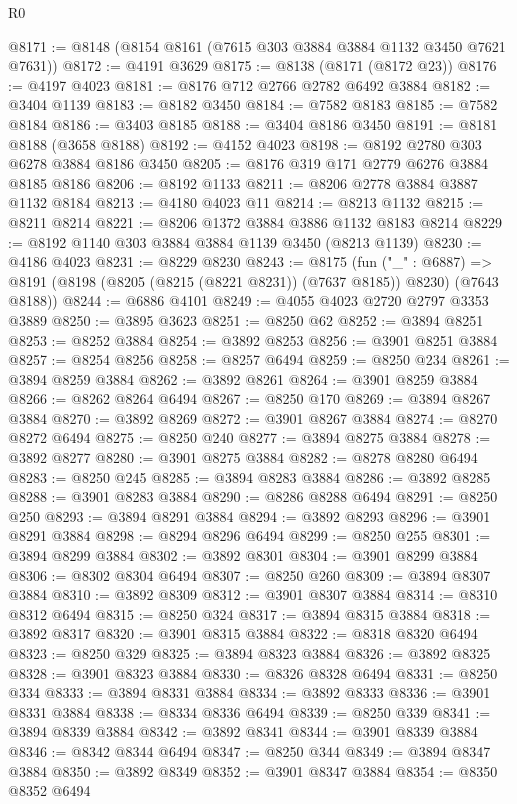 \begin{lexlean}{R0}
\begin{coremodule}
@8171 := @8148 (@8154 @8161 (@7615 @303 @3884 @3884 @1132 @3450 @7621 @7631))
@8172 := @4191 @3629
@8175 := @8138 (@8171 (@8172 @23))
@8176 := @4197 @4023
@8181 := @8176 @712 @2766 @2782 @6492 @3884
@8182 := @3404 @1139
@8183 := @8182 @3450
@8184 := @7582 @8183
@8185 := @7582 @8184
@8186 := @3403 @8185
@8188 := @3404 @8186 @3450
@8191 := @8181 @8188 (@3658 @8188)
@8192 := @4152 @4023
@8198 := @8192 @2780 @303 @6278 @3884 @8186 @3450
@8205 := @8176 @319 @171 @2779 @6276 @3884 @8185 @8186
@8206 := @8192 @1133
@8211 := @8206 @2778 @3884 @3887 @1132 @8184
@8213 := @4180 @4023 @11
@8214 := @8213 @1132
@8215 := @8211 @8214
@8221 := @8206 @1372 @3884 @3886 @1132 @8183 @8214
@8229 := @8192 @1140 @303 @3884 @3884 @1139 @3450 (@8213 @1139)
@8230 := @4186 @4023
@8231 := @8229 @8230
@8243 := @8175
    (fun ("_" : @6887) =>
    @8191 (@8198 (@8205 (@8215 (@8221 @8231)) (@7637 @8185)) @8230) (@7643 @8188))
@8244 := @6886 @4101
@8249 := @4055 @4023 @2720 @2797 @3353 @3889
@8250 := @3895 @3623
@8251 := @8250 @62
@8252 := @3894 @8251
@8253 := @8252 @3884
@8254 := @3892 @8253
@8256 := @3901 @8251 @3884
@8257 := @8254 @8256
@8258 := @8257 @6494
@8259 := @8250 @234
@8261 := @3894 @8259 @3884
@8262 := @3892 @8261
@8264 := @3901 @8259 @3884
@8266 := @8262 @8264 @6494
@8267 := @8250 @170
@8269 := @3894 @8267 @3884
@8270 := @3892 @8269
@8272 := @3901 @8267 @3884
@8274 := @8270 @8272 @6494
@8275 := @8250 @240
@8277 := @3894 @8275 @3884
@8278 := @3892 @8277
@8280 := @3901 @8275 @3884
@8282 := @8278 @8280 @6494
@8283 := @8250 @245
@8285 := @3894 @8283 @3884
@8286 := @3892 @8285
@8288 := @3901 @8283 @3884
@8290 := @8286 @8288 @6494
@8291 := @8250 @250
@8293 := @3894 @8291 @3884
@8294 := @3892 @8293
@8296 := @3901 @8291 @3884
@8298 := @8294 @8296 @6494
@8299 := @8250 @255
@8301 := @3894 @8299 @3884
@8302 := @3892 @8301
@8304 := @3901 @8299 @3884
@8306 := @8302 @8304 @6494
@8307 := @8250 @260
@8309 := @3894 @8307 @3884
@8310 := @3892 @8309
@8312 := @3901 @8307 @3884
@8314 := @8310 @8312 @6494
@8315 := @8250 @324
@8317 := @3894 @8315 @3884
@8318 := @3892 @8317
@8320 := @3901 @8315 @3884
@8322 := @8318 @8320 @6494
@8323 := @8250 @329
@8325 := @3894 @8323 @3884
@8326 := @3892 @8325
@8328 := @3901 @8323 @3884
@8330 := @8326 @8328 @6494
@8331 := @8250 @334
@8333 := @3894 @8331 @3884
@8334 := @3892 @8333
@8336 := @3901 @8331 @3884
@8338 := @8334 @8336 @6494
@8339 := @8250 @339
@8341 := @3894 @8339 @3884
@8342 := @3892 @8341
@8344 := @3901 @8339 @3884
@8346 := @8342 @8344 @6494
@8347 := @8250 @344
@8349 := @3894 @8347 @3884
@8350 := @3892 @8349
@8352 := @3901 @8347 @3884
@8354 := @8350 @8352 @6494

\end{coremodule}
\end{lexlean}
